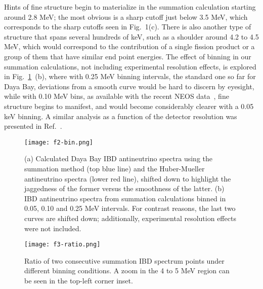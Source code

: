 \documentclass[twocolumn,amsmath,amssymb,10pt,superscriptaddress,a4paper,letterpaper,fleqn]{revtex4-1}
\begin{document}
Hints of fine structure begin to materialize in the summation calculation starting around 2.8 MeV; 
the most obvious is a sharp cutoff just below 3.5 MeV, which corresponds to the sharp cutoffs seen in Fig.~1(c). 
There is also another type of structure that spans several hundreds of keV, such as a shoulder around 4.2 to 4.5 MeV, which would correspond to the contribution of a single fission product or a group of them that have similar end point energies.
The effect of binning in our summation calculations, not including experimental resolution effects, is explored in Fig.~\ref{f.bin}~(b), where with 0.25 MeV binning intervals, 
the standard one so far for Daya Bay, deviations from a smooth curve would be hard to discern by eyesight, while with 0.10 MeV bins, as available with the recent NEOS data~\cite{neos17}, fine structure begins to manifest, and would become considerably clearer with a 0.05 keV binning.  
A similar analysis as a function of the detector resolution was presented in Ref.~\cite{dwyer15}.


\begin{figure}[t] 
\texttt{[image: f2-bin.png]}
\caption{
(a) Calculated Daya Bay IBD antineutrino spectra using the summation method (top blue line) 
and the Huber-Mueller antineutrino spectra (lower red line), shifted down to highlight the jaggedness of the former versus the smoothness of the latter.
(b) IBD antineutrino spectra from summation calculations binned in 0.05, 0.10 and 0.25 MeV intervals.   For contrast reasons, the last two curves are shifted down;
additionally, experimental resolution effects were not included.  
}
\label{f.bin}
\end{figure}   


\begin{figure}[t] 
\texttt{[image: f3-ratio.png]}
\caption{
Ratio of two consecutive summation IBD spectrum points under different binning conditions.
A zoom in the  4 to 5 MeV region can be seen in the top-left corner inset.
}
\label{f.ratio}
\end{figure}   
\end{document}
